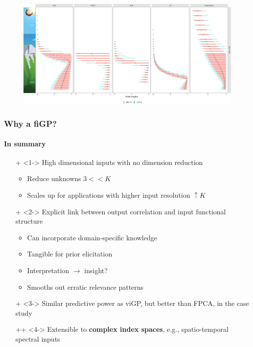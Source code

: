 \documentclass{snedecorbeamer}
\begin{document}
\begin{frame}[c]
  \begin{figure}
    \centering
    \includegraphics[width=1\textwidth]{image2934-8.png}
  \end{figure}
\end{frame}

\begin{frame}
  \frametitle{Why a fiGP?}
  \framesubtitle{In summary}

  \begin{itemize}
  \item[+]<1-> High dimensional inputs with no dimension reduction
    \begin{itemize}
    \item Reduce unknowns $3 << K$
    \item Scales up for applications with higher input resolution
      $\uparrow K$
    \end{itemize}
  \item[+]<2-> Explicit link between output correlation and
    input functional structure
    \begin{itemize}
    \item<2-> Can incorporate domain-specific knowledge
    \item<2-> Tangible for prior elicitation
    \item<2-> Interpretation $\to$ insight?
    \item<2-> Smooths out erratic relevance patterns
    \end{itemize}
  \item[+]<3-> Similar predictive power as viGP, but better than FPCA, in the
    case study~\hyperlink{frm:validation-statistics}{}
  \item[++]<4-> Extensible to \alert{\textbf{complex
        index spaces}}, e.g., spatio-temporal spectral inputs
  \end{itemize}
\end{frame}
\end{document}
